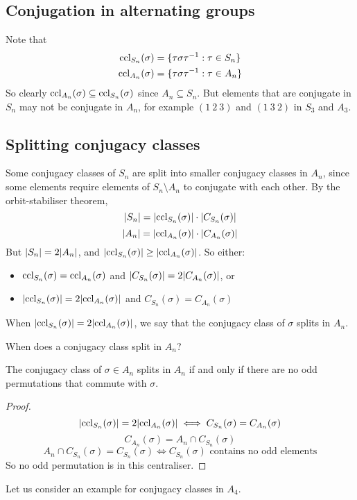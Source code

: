 \subsection{Conjugation in alternating groups}
Note that
\begin{align*}
	\operatorname{ccl}_{S_n}(\sigma) & = \{ \tau \sigma \tau^{-1} : \tau \in S_n \} \\
	\operatorname{ccl}_{A_n}(\sigma) & = \{ \tau \sigma \tau^{-1} : \tau \in A_n \}
\end{align*}
So clearly \(\operatorname{ccl}_{A_n}(\sigma) \subseteq \operatorname{ccl}_{S_n}(\sigma)\) since \(A_n \subseteq S_n\).
But elements that are conjugate in \(S_n\) may not be conjugate in \(A_n\), for example \((1\ 2\ 3)\) and \((1\ 3\ 2)\) in \(S_3\) and \(A_3\).

\subsection{Splitting conjugacy classes}
Some conjugacy classes of \(S_n\) are split into smaller conjugacy classes in \(A_n\), since some elements require elements of \(S_n \setminus A_n\) to conjugate with each other.
By the orbit-stabiliser theorem,
\[
	\abs{S_n} = \abs{\operatorname{ccl}_{S_n}(\sigma)} \cdot \abs{C_{S_n}(\sigma)}
\]
\[
	\abs{A_n} = \abs{\operatorname{ccl}_{A_n}(\sigma)} \cdot \abs{C_{A_n}(\sigma)}
\]
But \(\abs{S_n} = 2\abs{A_n}\), and \(\abs{\operatorname{ccl}_{S_n}(\sigma)} \geq \abs{\operatorname{ccl}_{A_n}(\sigma)}\).
So either:
\begin{itemize}
	\item \(\operatorname{ccl}_{S_n}(\sigma) = \operatorname{ccl}_{A_n}(\sigma)\) and \(\abs{C_{S_n}(\sigma)} = 2\abs{C_{A_n}(\sigma)}\), or
	\item \(\abs{\operatorname{ccl}_{S_n}(\sigma)} = 2 \abs{\operatorname{ccl}_{A_n}(\sigma)}\) and \(C_{S_n}(\sigma) = C_{A_n}(\sigma)\)
\end{itemize}
\begin{definition}
	When \(\abs{\operatorname{ccl}_{S_n}(\sigma)} = 2 \abs{\operatorname{ccl}_{A_n}(\sigma)}\), we say that the conjugacy class of \(\sigma\) splits in \(A_n\).
\end{definition}
When does a conjugacy class split in \(A_n\)?
\begin{proposition}
	The conjugacy class of \(\sigma \in A_n\) splits in \(A_n\) if and only if there are no odd permutations that commute with \(\sigma\).
\end{proposition}
\begin{proof}
	\[
		\abs{\operatorname{ccl}_{S_n}(\sigma)} = 2 \abs{\operatorname{ccl}_{A_n}(\sigma)} \iff C_{S_n}(\sigma) = C_{A_n}(\sigma)
	\]
	\[
		C_{A_n}(\sigma) = A_n \cap C_{S_n}(\sigma)
	\]
	\[
		A_n \cap C_{S_n}(\sigma) = C_{S_n}(\sigma) \iff C_{S_n}(\sigma)\text{ contains no odd elements}
	\]
	So no odd permutation is in this centraliser.
\end{proof}
Let us consider an example for conjugacy classes in \(A_4\).\medskip


